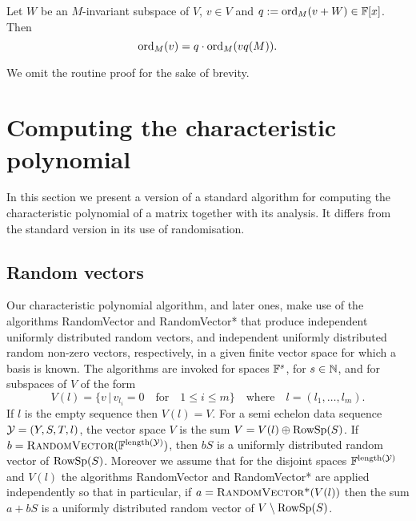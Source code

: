 \begin{Lemm}
\label{absordpoly}
Let $W$ be an $M$-invariant subspace of $V$, $v \in V$ and 
$q := \mathrm{ord}_M(v+W) \in \mathbb{F}[x]$. Then
\[ \mathrm{ord}_M(v) = q \cdot \mathrm{ord}_M(vq(M)). \]
\end{Lemm}
\noindent We omit the routine proof for the sake of brevity. \proofend

\section{Computing the characteristic polynomial}

\label{charpoly}

In this section we present a version of a standard algorithm for computing
the characteristic polynomial of a matrix together with its analysis. 
It differs from the standard version in its use of randomisation. 

\subsection{Random vectors}\label{random}

Our characteristic polynomial algorithm, and later ones, 
make use of the algorithms {\sc Ran\-dom\-Vec\-tor} and 
{\sc RandomVector*} that produce independent uniformly 
dis\-tri\-bu\-ted random vectors, and independent uniformly distributed
random non-zero vectors,             
respectively, in a given finite vector space for which a basis is known.    
The algorithms are invoked for spaces
$\mathbb{F}^s$, for $s \in \mathbb{N}$, and for subspaces of $V$ of the form
\[
V(l)=\{ v\,|\, v_{l_i}=0\quad\mbox{for}\quad  1\leq i\leq m\}
\quad\mbox{where}\quad l=(l_1,\dots,l_m).
\]
If $l$ is the empty sequence then $V(l)=V$.
For a semi echelon data sequence $\mathcal{Y} = (Y,S,T,l)$, the 
vector space $V$ is the sum $V=V(l) \oplus \mathrm{RowSp}(S)$. 
If $b=\mbox{\sc RandomVector}(\mathbb{F}^{\mathrm{length}(\mathcal{Y})})$, then $bS$ is a
uniformly distributed random vector of $\mathrm{RowSp}(S)$. 
Moreover we assume that for the disjoint spaces 
$\mathbb{F}^{\mathrm{length}(\mathcal{Y})}$ and $V(l)$ the 
algorithms {\sc RandomVector} and {\sc RandomVector*} are applied 
independently so that in particular, 
if $a=\mbox{\sc RandomVector*}(V(l))$ 
then the sum 
$a + bS$ is a uniformly distributed random vector of $V\setminus \mathrm{RowSp}(S)$. 

